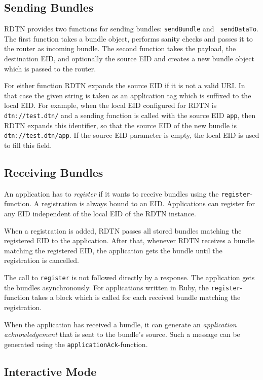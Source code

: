 \documentclass{article}
\begin{document}
\subsection{Sending Bundles}\label{sec.sending}

RDTN provides two functions for sending bundles: {\tt sendBundle} and {\tt
sendDataTo}. The first function takes a bundle object, performs sanity checks
and passes it to the router as incoming bundle. The second function takes the
payload, the destination EID, and optionally the source EID and creates a new
bundle object which is passed to the router.

For either function RDTN expands the source EID if it is not a valid URI. In
that case the given string is taken as an application tag which is suffixed to
the local EID. For example, when the local EID configured for RDTN is {\tt
dtn://test.dtn/} and a sending function is called with the source EID {\tt app},
then RDTN expands this identifier, so that the source EID of the new bundle is
{\tt dtn://test.dtn/app}. If the source EID parameter is empty, the local EID is
used to fill this field.

\subsection{Receiving Bundles}\label{sec.receiving}

An application has to {\em register} if it wants to receive bundles using the
{\tt register}-function. A registration is always bound to an EID. Applications 
can register for any EID independent of the local EID of the RDTN instance.

When a registration is added, RDTN passes all stored bundles matching the
registered EID to the application. After that, whenever RDTN receives a bundle 
matching the registered EID, the application gets the bundle until the 
registration is cancelled.

The call to {\tt register} is not followed directly by a response. The
application gets the bundles asynchronously. For applications written in Ruby,
the {\tt register}-function takes a block which is called for each received
bundle matching the registration.

When the application has received a bundle, it can generate an {\em application
acknowledgement} that is sent to the bundle's source. Such a message can be
generated using the {\tt applicationAck}-function.

\subsection{Interactive Mode}\label{sec.interactive}
\end{document}
